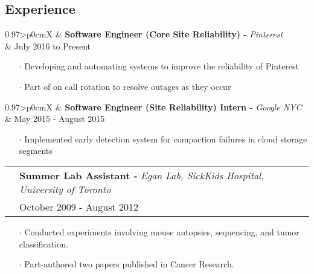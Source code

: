 \documentclass[letterpaper, oneside, final]{scrartcl} %
\newcommand{\gray}{\rowcolor[gray]{.90}} %
\begin{document}
\begin{center}
\vspace{-0.5cm}

\section{Experience}

\renewcommand{\arraystretch}{1.3}

\begin{tabularx}{0.97\linewidth}{>{\raggedleft\scshape}p{0cm}X}
\gray & \textbf{Software Engineer (Core Site Reliability) -} \textit{Pinterest}\\
\gray & {July 2016 to Present}\\
\end{tabularx}
\vspace{-0.1cm}
\begin{itemize} \itemsep-0.2cm
\item[$\cdot$] Developing and automating systems to improve the reliability of Pinterest\\
\item[$\cdot$] Part of on call rotation to resolve outages as they occur\\
\end{itemize}

\begin{tabularx}{0.97\linewidth}{>{\raggedleft\scshape}p{0cm}X}
\gray & \textbf{Software Engineer (Site Reliability) Intern -} \textit{Google NYC}\\
\gray & {May 2015 - August 2015}\\
\end{tabularx}
\vspace{-0.1cm}
\begin{itemize} \itemsep-0.2cm
\item[$\cdot$] Implemented early detection system for compaction failures in cloud storage segments\\
\end{itemize}

\begin{tabularx}{0.97\linewidth}{>{\raggedleft\scshape}p{0cm}X}
\gray & \textbf{Summer Lab Assistant -} \textit{Egan Lab, SickKids Hospital, University of Toronto}\\
\gray & {October 2009 - August 2012}\\
\end{tabularx}
\vspace{-0.1cm}
\begin{itemize} \itemsep-0.2cm
\item[$\cdot$] Conducted experiments involving mouse autopsies, sequencing, and tumor classification.
\item[$\cdot$] Part-authored two papers published in Cancer Research.\\
\end{itemize}


\end{center}
\end{document}
